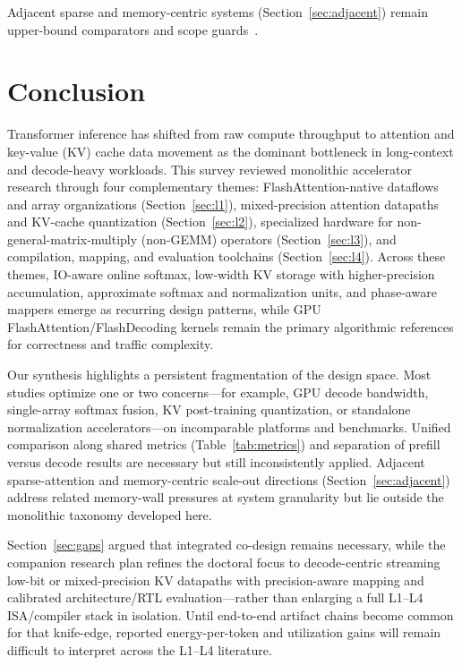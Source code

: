 \documentclass[conference]{IEEEtran}
\begin{document}
Adjacent sparse and memory-centric systems (Section~\ref{sec:adjacent}) remain upper-bound comparators and scope guards~\cite{amma2026,salca2026,plena2025}.

\section{Conclusion}
\label{sec:conclusion}

Transformer inference has shifted from raw compute throughput to attention and key-value (KV) cache data movement as the dominant bottleneck in long-context and decode-heavy workloads.
This survey reviewed monolithic accelerator research through four complementary themes: FlashAttention-native dataflows and array organizations (Section~\ref{sec:l1}), mixed-precision attention datapaths and KV-cache quantization (Section~\ref{sec:l2}), specialized hardware for non-general-matrix-multiply (non-GEMM) operators (Section~\ref{sec:l3}), and compilation, mapping, and evaluation toolchains (Section~\ref{sec:l4}).
Across these themes, IO-aware online softmax, low-width KV storage with higher-precision accumulation, approximate softmax and normalization units, and phase-aware mappers emerge as recurring design patterns, while GPU FlashAttention/FlashDecoding kernels remain the primary algorithmic references for correctness and traffic complexity.

Our synthesis highlights a persistent fragmentation of the design space.
Most studies optimize one or two concerns---for example, GPU decode bandwidth, single-array softmax fusion, KV post-training quantization, or standalone normalization accelerators---on incomparable platforms and benchmarks.
Unified comparison along shared metrics (Table~\ref{tab:metrics}) and separation of prefill versus decode results are necessary but still inconsistently applied.
Adjacent sparse-attention and memory-centric scale-out directions (Section~\ref{sec:adjacent}) address related memory-wall pressures at system granularity but lie outside the monolithic taxonomy developed here.

Section~\ref{sec:gaps} argued that integrated co-design remains necessary, while the companion research plan refines the doctoral focus to decode-centric streaming low-bit or mixed-precision KV datapaths with precision-aware mapping and calibrated architecture/RTL evaluation---rather than enlarging a full L1--L4 ISA/compiler stack in isolation.
Until end-to-end artifact chains become common for that knife-edge, reported energy-per-token and utilization gains will remain difficult to interpret across the L1--L4 literature.


\begingroup
\raggedright

\endgroup
\end{document}
